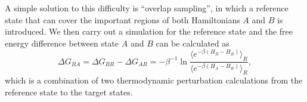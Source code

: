 A simple solution to this difficulty is ``overlap sampling'', in which a reference state that can cover the important regions of both Hamiltonians $A$ and $B$ is introduced.
We then carry out a simulation for the reference state and the free energy difference between state $A$ and $B$ can be calculated as
\begin{equation}
	\Delta G_{BA}=\Delta G_{BR}-\Delta G_{AR}=-\beta^{-1}\ln{\dfrac{\langle e^{-\beta\left(H_B-H_R\right)}\rangle_R}{\langle e^{-\beta\left(H_A-H_R\right)}\rangle_R}},
\end{equation} 
which is a combination of two thermodynamic perturbation calculations from the reference state to the target states.

